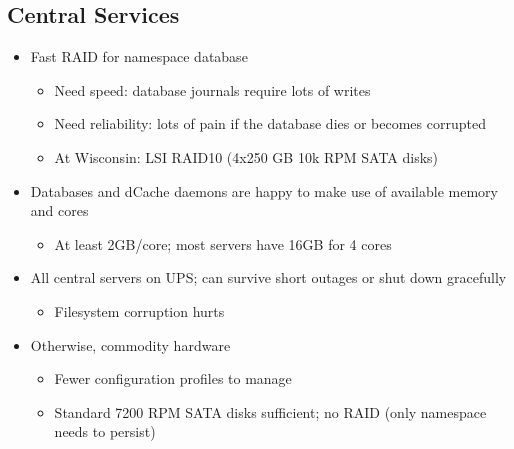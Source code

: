 \documentclass{beamer}
\begin{document}
\subsection{Central Services}
\begin{frame}
\begin{itemize}
	\item Fast RAID for namespace database
	\begin{itemize}
		\item Need speed: database journals require lots of writes
		\item Need reliability: lots of pain if the database dies or becomes corrupted
		\item At Wisconsin: LSI RAID10 (4x250 GB 10k RPM SATA disks)
	\end{itemize}
	\item Databases and dCache daemons are happy to make use of available memory and cores
	\begin{itemize}
		\item At least 2GB/core; most servers have 16GB for 4 cores
	\end{itemize}
	\item All central servers on UPS; can survive short outages or shut down gracefully
	\begin{itemize}
		\item Filesystem corruption hurts
	\end{itemize}
	\item Otherwise, commodity hardware
	\begin{itemize}
		\item Fewer configuration profiles to manage
		\item Standard 7200 RPM SATA disks sufficient; no RAID (only namespace needs to persist)
	\end{itemize}
\end{itemize}
\end{frame}
\end{document}
